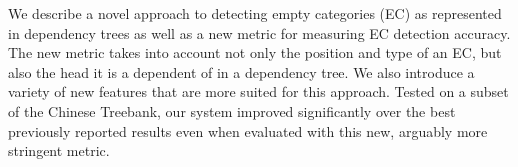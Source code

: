 We describe a novel approach to detecting empty categories (EC) as represented in dependency trees as well as a new metric for measuring EC detection
 accuracy. The new metric takes into account not only the position and type of
 an EC, but also the head it is a dependent of in a dependency tree. We also
 introduce a variety of new features that are more suited for this approach.
 Tested on a subset of the Chinese Treebank, our system improved
 significantly over the best previously reported results even when evaluated
 with this new, arguably more stringent metric.

